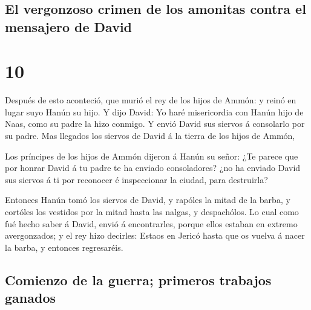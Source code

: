 \hypertarget{el-vergonzoso-crimen-de-los-amonitas-contra-el-mensajero-de-david}{%
\subsection{El vergonzoso crimen de los amonitas contra el mensajero de
David}\label{el-vergonzoso-crimen-de-los-amonitas-contra-el-mensajero-de-david}}

\hypertarget{section-9}{%
\section{10}\label{section-9}}

 Después de esto aconteció, que murió el rey de los hijos
de Ammón: y reinó en lugar suyo Hanún su hijo.  Y dijo
David: Yo haré misericordia con Hanún hijo de Naas, como su padre la
hizo conmigo. Y envió David sus siervos á consolarlo por su padre. Mas
llegados los siervos de David á la tierra de los hijos de Ammón,

 Los príncipes de los hijos de Ammón dijeron á Hanún su
señor: ¿Te parece que por honrar David á tu padre te ha enviado
consoladores? ¿no ha enviado David sus siervos á ti por reconocer é
inspeccionar la ciudad, para destruirla?

 Entonces Hanún tomó los siervos de David, y rapóles la
mitad de la barba, y cortóles los vestidos por la mitad hasta las
nalgas, y despachólos.  Lo cual como fué hecho saber á
David, envió á encontrarles, porque ellos estaban en extremo
avergonzados; y el rey hizo decirles: Estaos en Jericó hasta que os
vuelva á nacer la barba, y entonces regresaréis.

\hypertarget{comienzo-de-la-guerra-primeros-trabajos-ganados}{%
\subsection{Comienzo de la guerra; primeros trabajos
ganados}\label{comienzo-de-la-guerra-primeros-trabajos-ganados}}


